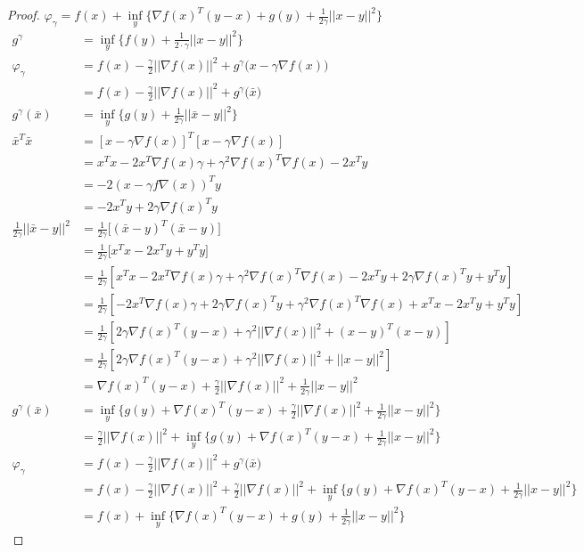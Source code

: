 \begin{proof}
	$\varphi_{\gamma} =   f(x) + \underset{y}{\inf} \Big\{ \nabla f(x)^T(y-x) + g(y) + \frac{1}{2 \gamma} ||x-y||^2  \Big\} $
	\begin{align*}
	g^{\gamma} 	&=  \underset{y}{\inf} \big \{f(y)+\frac{1}{2 \cdot \gamma}||x-y||^2 \big \} \\
	\varphi_{\gamma} 
	&= f(x) - \frac{\gamma}{2}||\nabla f(x)||^2 + g^{\gamma} \big(x-\gamma \nabla f(x) \big) \\
	&= f(x) - \frac{\gamma}{2}||\nabla f(x)||^2 + g^{\gamma} \big(\bar{x} \big)\\
	g^{\gamma} (\bar{x})
	&=\underset{y}{\inf} \Big\{g(y)+\frac{1}{2 \gamma}||\bar{x}-y||^2 \Big\}	\\
	\bar{x}^T\bar{x}
	&=[x- \gamma \nabla f(x)]^T[x- \gamma \nabla f(x)] \\
	&= x^Tx -2x^T\nabla f(x) \gamma + \gamma^2 \nabla f(x)^T\nabla f(x)-2x^Ty \\
	&=-2(x-\gamma f\nabla(x))^Ty\\
	&=-2x^Ty + 2\gamma \nabla f(x)^Ty \\
	\frac{1}{2 \gamma}||\bar{x}-y||^2
	&=\frac{1}{2 \gamma} \Big [ (\bar{x}-y)^T(\bar{x}-y) \Big]\\
	&=\frac{1}{2 \gamma} \Big [ x^Tx - 2 x^Ty + y^Ty \Big]\\
	& =\frac{1}{2 \gamma}[x^Tx-2x^T\nabla f(x) \gamma + \gamma^2 \nabla f(x)^T\nabla f(x) -2x^Ty + 2\gamma \nabla f(x)^Ty +y^Ty] \\
	& = \frac{1}{2 \gamma}[-2x^T\nabla f(x) \gamma  + 2\gamma \nabla f(x)^Ty + \gamma^2 \nabla f(x)^T\nabla f(x) +x^Tx -2x^Ty +y^Ty]\\
	&= \frac{1}{2 \gamma}[ 2\gamma \nabla f(x)^T(y-x) + \gamma^2||\nabla f(x)||^2 + (x-y)^T(x-y)]\\
	&= \frac{1}{2 \gamma}[ 2\gamma \nabla f(x)^T(y-x) + \gamma^2||\nabla f(x)||^2 + ||x-y||^2] \\
	&=  \nabla f(x)^T(y-x) +\frac{\gamma}{2}||\nabla f(x)||^2 + \frac{1}{2 \gamma} ||x-y||^2 \\
	g^{\gamma} (\bar{x})
	&=\underset{y}{\inf} \Big\{g(y)+ \nabla f(x)^T(y-x) +\frac{\gamma}{2}||\nabla f(x)||^2 + \frac{1}{2 \gamma} ||x-y||^2  \Big\} \\
	&= \frac{\gamma}{2}||\nabla f(x)||^2 + \underset{y}{\inf} \Big\{g(y)+ \nabla f(x)^T(y-x) + \frac{1}{2 \gamma} ||x-y||^2  \Big\} \\
	\varphi_{\gamma} 
	&= f(x) - \frac{\gamma}{2}||\nabla f(x)||^2 + g^{\gamma} \big(\bar{x} \big)\\
	&= f(x) - \frac{\gamma}{2}||\nabla f(x)||^2 +  \frac{\gamma}{2}||\nabla f(x)||^2 + \underset{y}{\inf} \Big\{g(y)+ \nabla f(x)^T(y-x) + \frac{1}{2 \gamma} ||x-y||^2  \Big\}\\
	&=   f(x) + \underset{y}{\inf} \Big\{ \nabla f(x)^T(y-x) + g(y) + \frac{1}{2 \gamma} ||x-y||^2  \Big\} 
	\end{align*}
	\label{prf:FBE alterative expression}
\end{proof}

